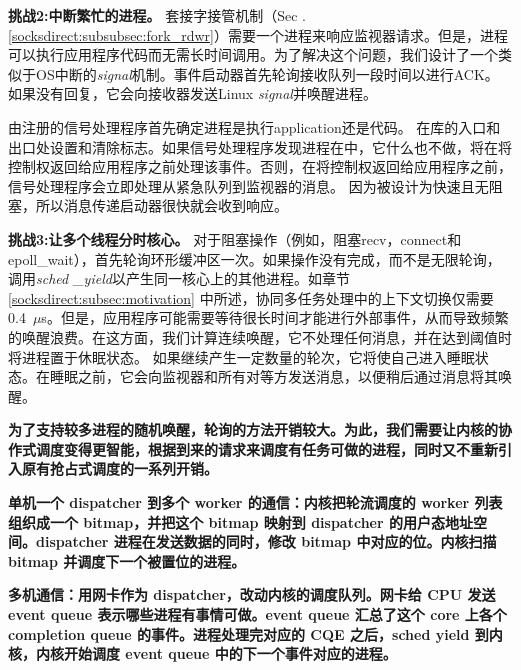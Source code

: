 \textbf {挑战2:中断繁忙的进程。}
套接字接管机制（Sec .~ \ref {socksdirect:subsubsec:fork_rdwr}）需要一个进程来响应监视器请求。但是，进程可以执行应用程序代码而无需长时间调用\libipc {}。为了解决这个问题，我们设计了一个类似于OS中断的\textit {signal}机制。事件启动器首先轮询接收队列一段时间以进行ACK。如果没有回复，它会向接收器发送Linux \textit {signal}并唤醒进程。

由\libipc {}注册的信号处理程序首先确定进程是执行application还是\libipc {}代码。 \libipc {}在库的入口和出口处设置和清除标志。如果信号处理程序发现进程在\libipc 中，它什么也不做，\libipc {}将在将控制权返回给应用程序之前处理该事件。否则，在将控制权返回给应用程序之前，信号处理程序会立即处理从紧急队列到监视器的消息。
因为\libipc {}被设计为快速且无阻塞，所以消息传递启动器很快就会收到响应。

\textbf {挑战3:让多个线程分时核心。}
对于阻塞操作（例如，阻塞recv，connect和epoll\_wait），\libipc {}首先轮询环形缓冲区一次。如果操作没有完成，而不是无限轮询，\libipc {}调用\textit {sched \_yield}以产生同一核心上的其他进程。如章节 \ref {socksdirect:subsec:motivation} 中所述，协同多任务处理中的上下文切换仅需要0.4~$\mu$s。但是，应用程序可能需要等待很长时间才能进行外部事件，从而导致频繁的唤醒浪费。在这方面，我们计算连续唤醒，它不处理任何消息，并在达到阈值时将进程置于休眠状态。
如果\libipc {}继续产生一定数量的轮次，它将使自己进入睡眠状态。在睡眠之前，它会向监视器和所有对等方发送消息，以便稍后通过消息将其唤醒。

\textbf{为了支持较多进程的随机唤醒，轮询的方法开销较大。为此，我们需要让内核的协作式调度变得更智能，根据到来的请求来调度有任务可做的进程，同时又不重新引入原有抢占式调度的一系列开销。}

\textbf{单机一个 dispatcher 到多个 worker 的通信：内核把轮流调度的 worker 列表组织成一个 bitmap，并把这个 bitmap 映射到 dispatcher 的用户态地址空间。dispatcher 进程在发送数据的同时，修改 bitmap 中对应的位。内核扫描 bitmap 并调度下一个被置位的进程。}

\textbf{多机通信：用网卡作为 dispatcher，改动内核的调度队列。网卡给 CPU 发送 event queue 表示哪些进程有事情可做。event queue 汇总了这个 core 上各个 completion queue 的事件。进程处理完对应的 CQE 之后，sched yield 到内核，内核开始调度 event queue 中的下一个事件对应的进程。}


